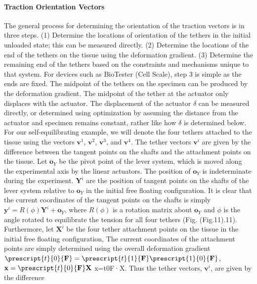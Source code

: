     
    \paragraph{Traction Orientation Vectors} The general process for determining the orientation of the traction vectors is in three steps. (1) Determine the locations of orientation of the tethers in the initial unloaded state; this can be measured directly. (2) Determine the locations of the end of the tethers on the tissue using the deformation gradient. (3) Determine the remaining end of the tethers based on the constraints and mechanisms unique to that system. For devices such as BioTester (Cell Scale), step 3 is simple as the ends are fixed. The midpoint of the tethers on the specimen can be produced by the deformation gradient. The midpoint of the tether at the actuator only displaces with the actuator. The displacement of the actuator $\delta$ can be measured directly, or determined using optimization by assuming the distance from the actuator and specimen remains constant, rather like how $\delta$ is determined below. For our self-equilibrating example, we will denote the four tethers attached to the tissue using the vectors $\mathbf{v}^1$, $\mathbf{v}^2$, $\mathbf{v}^3$, and $\mathbf{v}^4$. The tether vectors $\mathbf{v}^i$ are given by the difference between the tangent points on the shafts and the attachment points on the tissue. Let $\mathbf{o}_Y$ be the pivot point of the lever system, which is moved along the experimental axis by the linear actuators. The position of $\mathbf{o}_Y$ is indeterminate during the experiment. $\mathbf{Y}^i$ are the position of tangent points on the shafts of the lever system relative to $\mathbf{o}_Y$ in the initial free floating configuration. It is clear that the current coordinates of the tangent points on the shafts is simply $\mathbf{y}^i = R(\phi)\mathbf{Y}^i + \mathbf{o}_Y$, where $R(\phi)$ is a rotation matrix about $\mathbf{o}_Y$ and $\phi$ is the angle rotated to equilibrate the tension for all four tethers (Fig. (Fig.11).11). Furthermore, let $\mathbf{X}^i$ be the four tether attachment points on the tissue in the initial free floating configuration, The current coordinates of the attachment points are simply determined using the overall deformation gradient $\prescript{t}{0}{\mathbf{F}} = \prescript{t}{1}{\mathbf{F}}\prescript{1}{0}{\mathbf{F}}$, $\mathbf{x} = \prescript{t}{0}{\mathbf{F}}\mathbf{X}$ x=t0F·X. Thus the tether vectors, $\mathbf{v}^i$, are given by the difference